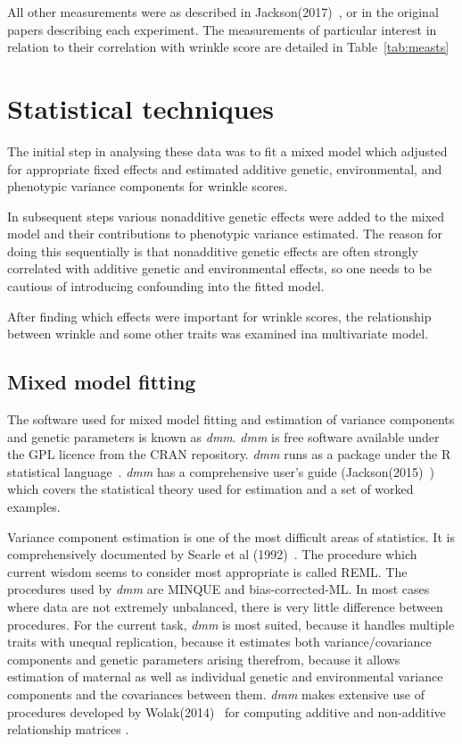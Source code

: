 \documentclass[titlepage]{article}  %
\begin{document}
All other measurements were as described in Jackson(2017)~\cite{jack:17}, or  in the original papers describing each experiment. The measurements of particular interest in relation to their correlation with wrinkle score are detailed in Table~\ref{tab:measts}


\section{Statistical techniques}
\label{sect:stats}
The initial step in analysing these data was to fit a mixed model which adjusted for appropriate fixed effects and estimated additive genetic, environmental, and phenotypic variance components for wrinkle scores. 

In subsequent steps various nonadditive genetic effects were added to the mixed model and their contributions to phenotypic variance estimated.  The reason for doing this sequentially is that nonadditive genetic effects are often  strongly correlated with additive genetic and environmental effects, so one needs to be cautious of introducing confounding into the fitted model.

After finding which effects were important for wrinkle scores, the relationship between wrinkle and some other traits was examined ina multivariate model.

\subsection{Mixed model fitting}
The software used for mixed model fitting and estimation of variance components and genetic parameters is known as {\em dmm}. {\em dmm} is free software available under the GPL licence from the CRAN repository. {\em dmm} runs as a package under the R statistical language~\cite{rprog:13}. {\em dmm} has a comprehensive user's guide (Jackson(2015)~\cite{jack:15b}) which covers the statistical theory used for estimation and a set of worked examples.

Variance component estimation is one of the most difficult areas of statistics. It is comprehensively documented by Searle et al (1992)~\cite{sear:92}. The procedure which current wisdom seems to consider most appropriate is called REML. The procedures used by {\em dmm} are MINQUE and bias-corrected-ML. In most cases where data are not extremely unbalanced, there is very little difference between procedures.  For the current task, {\em dmm} is most suited, because it handles multiple traits with unequal replication, because it estimates both variance/covariance components and genetic parameters arising therefrom, because it allows estimation of maternal as well as individual genetic and environmental variance components and the covariances between them.  {\em dmm} makes extensive use of procedures developed by Wolak(2014)~\cite{wola:14} for computing additive and non-additive relationship matrices .
\end{document}
